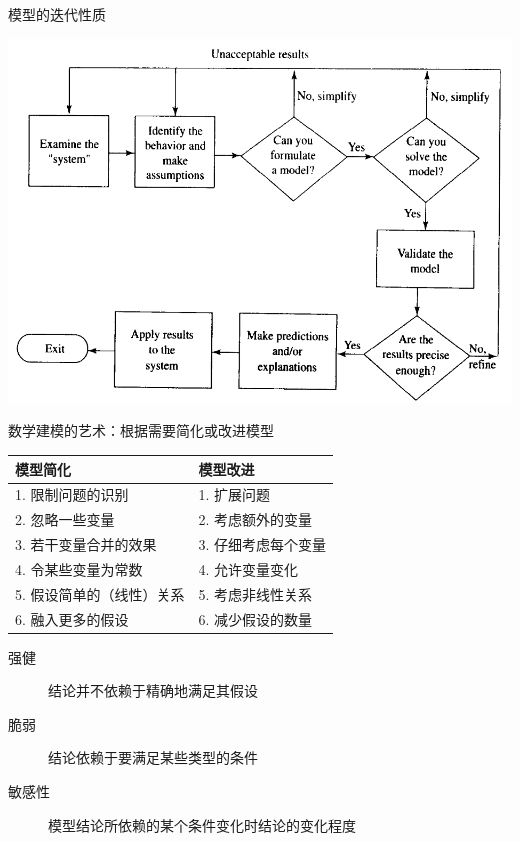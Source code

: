\documentclass[mathserif]{beamer}
\begin{document}
\begin{frame}{模型的迭代性质}

  \begin{center}
    \includegraphics[width=.8\textwidth{}]{modeliterate.png}
  \end{center}
  
\end{frame}

\begin{frame}{数学建模的艺术：根据需要简化或改进模型}

  \begin{table}[ht]
    \centering
    \begin{tabular}{ll}
      模型简化 & 模型改进\\
      \hline{}
      1. 限制问题的识别 & 1. 扩展问题\\
      2. 忽略一些变量 & 2. 考虑额外的变量\\
      3. 若干变量合并的效果 & 3. 仔细考虑每个变量\\
      4. 令某些变量为常数 & 4. 允许变量变化\\
      5. 假设简单的（线性）关系 & 5. 考虑非线性关系\\
      6. 融入更多的假设 & 6. 减少假设的数量
    \end{tabular}
  \end{table}

  \begin{description}
  \item[强健] 结论并不依赖于精确地满足其假设
  \item[脆弱] 结论依赖于要满足某些类型的条件
  \item[敏感性] 模型结论所依赖的某个条件变化时结论的变化程度
  \end{description}

\end{frame}
\end{document}
